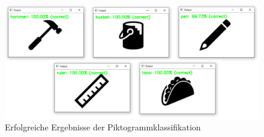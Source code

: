 \begin{figure}[H]
  \includegraphics[width=1.0\textwidth]{img/piktogrammerkennung/collageCNN.PNG}
  \centering
  \caption{Erfolgreiche Ergebnisse der Piktogrammklassifikation}
  \label{fig:erfolgreiche-klassifikation-mit-cnn-1}
\end{figure}
   
